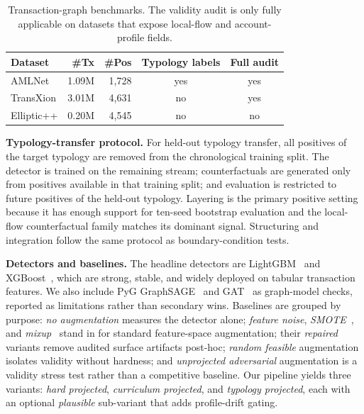 \documentclass[sigconf,review,anonymous]{acmart}
\begin{document}
\begin{table}[t]
\centering
\caption{Transaction-graph benchmarks. The validity audit is only fully
applicable on datasets that expose local-flow and account-profile fields.}
\label{tab:datasets}
\setlength{\tabcolsep}{4pt}
\renewcommand{\arraystretch}{1.08}
\small
\begin{tabular}{@{}lrrcc@{}}
\toprule
\textbf{Dataset} & \textbf{\#Tx} & \textbf{\#Pos} & \textbf{Typology labels} & \textbf{Full audit} \\
\midrule
AMLNet      & 1.09M & 1{,}728 & yes & yes \\
TransXion   & 3.01M & 4{,}631 & no  & yes \\
Elliptic++  & 0.20M & 4{,}545 & no  & no  \\
\bottomrule
\end{tabular}
\end{table}

\textbf{Typology-transfer protocol.}
For held-out typology transfer, all positives of the target typology are
removed from the chronological training split. The detector is trained on the
remaining stream; counterfactuals are generated only from positives available
in that training split; and evaluation is restricted to future positives of
the held-out typology. Layering is the primary positive setting because it has
enough support for ten-seed bootstrap evaluation and the local-flow
counterfactual family matches its dominant signal. Structuring and integration
follow the same protocol as boundary-condition tests.

\textbf{Detectors and baselines.}
The headline detectors are LightGBM~\cite{ke2017lightgbm} and
XGBoost~\cite{chen2016xgboost}, which are strong, stable, and widely deployed
on tabular transaction features. We also include PyG
GraphSAGE~\cite{hamilton2017inductive} and GAT~\cite{velickovic2018graph} as
graph-model checks, reported as limitations rather than secondary wins.
Baselines are grouped by purpose: \emph{no augmentation} measures the detector
alone; \emph{feature noise}, \emph{SMOTE}~\cite{chawla2002smote}, and
\emph{mixup}~\cite{zhang2018mixup} stand in for standard feature-space
augmentation; their \emph{repaired} variants remove audited surface artifacts
post-hoc; \emph{random feasible} augmentation isolates validity without
hardness; and \emph{unprojected adversarial} augmentation is a validity stress
test rather than a competitive baseline. Our pipeline yields three variants:
\emph{hard projected}, \emph{curriculum projected}, and \emph{typology
projected}, each with an optional \emph{plausible} sub-variant that adds
profile-drift gating.
\end{document}
